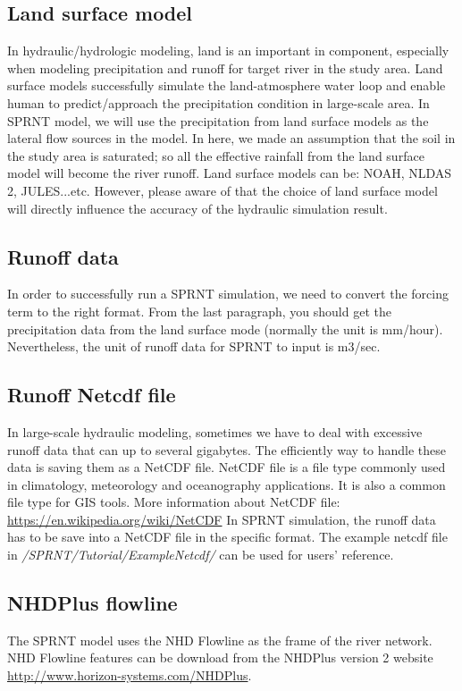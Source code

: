 \documentclass[12pt, letterpaper]{article}
\begin{document}
\begin{flushleft} %

\subsection{Land surface model}
In hydraulic/hydrologic modeling, land is an important in component, especially when modeling precipitation and runoff for target river in the study area. Land surface models successfully simulate the land-atmosphere water loop and enable human to predict/approach the precipitation condition in large-scale area. In SPRNT model, we will use the precipitation from land surface models as the lateral flow sources in the model. In here, we made an assumption that the soil in the study area is saturated; so all the effective rainfall from the land surface model will become the river runoff.
Land surface models can be: NOAH, NLDAS 2, JULES...etc. However, please aware of that the choice of land surface model will directly influence the accuracy of the hydraulic simulation result.
\subsection{Runoff data}
In order to successfully run a SPRNT simulation, we need to convert the forcing term to the right format. From the last paragraph, you should get the precipitation data from the land surface mode (normally the unit is mm/hour). Nevertheless, the unit of runoff data for SPRNT to input is m3/sec.


\subsection{Runoff Netcdf file}
In large-scale hydraulic modeling, sometimes we have to deal with excessive runoff data that can up to several gigabytes. The efficiently way to handle these data is saving them as a NetCDF file.
NetCDF file is a file type commonly used in climatology, meteorology and oceanography applications. It is also a common file type for GIS tools. More information about NetCDF file: \url{https://en.wikipedia.org/wiki/NetCDF}
In SPRNT simulation, the runoff data has to be save into a NetCDF file in the specific format. The example netcdf file in \emph{/SPRNT/Tutorial/ExampleNetcdf/} can be used for users' reference.

\subsection{NHDPlus flowline}
The SPRNT model uses the NHD Flowline as the frame of the river network. NHD Flowline features can be download from the NHDPlus version 2 website \url{http://www.horizon-systems.com/NHDPlus}.


\end{flushleft}
\end{document}
